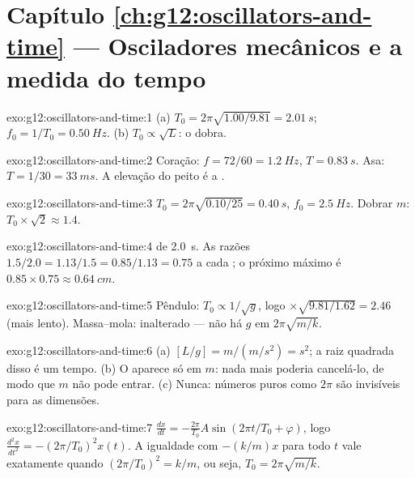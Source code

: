 \section*{Capítulo \ref{ch:g12:oscillators-and-time} --- Osciladores mecânicos e a medida do tempo}

\begin{solution}{exo:g12:oscillators-and-time:1}
(a) $T_0 = 2\pi\sqrt{1.00/9.81} = \qty{2.01}{s}$;
$f_0 = 1/T_0 = \qty{0.50}{Hz}$. (b) $T_0 \propto \sqrt{L}$: o 
dobra.
\end{solution}

\begin{solution}{exo:g12:oscillators-and-time:2}
Coração: $f = 72/60 = \qty{1.2}{Hz}$, $T = \qty{0.83}{s}$. Asa:
$T = 1/30 = \qty{33}{ms}$. A elevação do peito é a \emph{}.
\end{solution}

\begin{solution}{exo:g12:oscillators-and-time:3}
$T_0 = 2\pi\sqrt{0.10/25} = \qty{0.40}{s}$, $f_0 = \qty{2.5}{Hz}$.
Dobrar $m$: $T_0 \times \sqrt{2} \approx 1.4$.
\end{solution}

\begin{solution}{exo:g12:oscillators-and-time:4}
 de \qty{2.0}{s}. As razões
$1.5/2.0 = 1.13/1.5 = 0.85/1.13 = 0.75$ a cada ; o próximo máximo
é $0.85 \times 0.75 \approx \qty{0.64}{cm}$.
\end{solution}

\begin{solution}{exo:g12:oscillators-and-time:5}
Pêndulo: $T_0 \propto 1/\sqrt{g}$, logo $\times\sqrt{9.81/1.62} = 2.46$
(mais lento). Massa--mola: inalterado --- não há $g$ em
$2\pi\sqrt{m/k}$.
\end{solution}

\begin{solution}{exo:g12:oscillators-and-time:6}
(a) $[L/g] = \unit{m}/(\unit{m/s^2}) = \unit{s^2}$; a raiz quadrada
disso é um tempo. (b) O  aparece só em $m$: nada mais poderia
cancelá-lo, de modo que $m$ não pode entrar. (c) Nunca: números puros
como $2\pi$ são invisíveis para as dimensões.
\end{solution}

\begin{solution}{exo:g12:oscillators-and-time:7}
$\frac{dx}{dt} = -\frac{2\pi}{T_0}A\sin(2\pi t/T_0 + \varphi)$, logo
$\frac{d^2x}{dt^2} = -(2\pi/T_0)^2 x(t)$. A igualdade com $-(k/m)x$ para
todo $t$ vale exatamente quando $(2\pi/T_0)^2 = k/m$, ou seja,
$T_0 = 2\pi\sqrt{m/k}$.
\end{solution}

